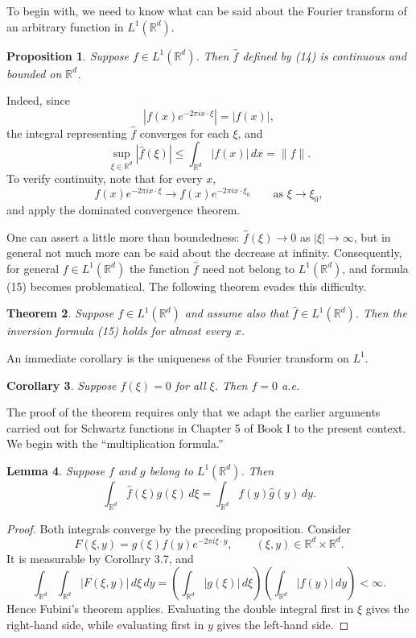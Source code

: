 \documentclass[11pt,openany]{book}
\newtheorem{theorem}{Theorem}[section]
\newtheorem{lemma}[theorem]{Lemma}
\newtheorem{corollary}[theorem]{Corollary}
\newtheorem{proposition}[theorem]{Proposition}
\begin{document}
To begin with, we need to know what can be said about the Fourier transform of an arbitrary function in $L^1(\mathbb{R}^d)$.

\begin{proposition}
Suppose $f\in L^1(\mathbb{R}^d)$. Then $\widehat f$ defined by (14) is continuous and bounded on $\mathbb{R}^d$.
\end{proposition}

Indeed, since
\[
|f(x)e^{-2\pi i x\cdot\xi}|=|f(x)|,
\]
the integral representing $\widehat f$ converges for each $\xi$, and
\[
\sup_{\xi\in\mathbb{R}^d}|\widehat f(\xi)|
\leq\int_{\mathbb{R}^d}|f(x)|\,dx
=\|f\|.
\]
To verify continuity, note that for every $x$,
\[
f(x)e^{-2\pi i x\cdot\xi}
\longrightarrow
f(x)e^{-2\pi i x\cdot\xi_0}
\qquad\text{as }\xi\to\xi_0,
\]
and apply the dominated convergence theorem.

One can assert a little more than boundedness: $\widehat f(\xi)\to0$ as $|\xi|\to\infty$, but in general not much more can be said about the decrease at infinity. Consequently, for general $f\in L^1(\mathbb{R}^d)$ the function $\widehat f$ need not belong to $L^1(\mathbb{R}^d)$, and formula (15) becomes problematical. The following theorem evades this difficulty.

\begin{theorem}
Suppose $f\in L^1(\mathbb{R}^d)$ and assume also that $\widehat f\in L^1(\mathbb{R}^d)$. Then the inversion formula (15) holds for almost every $x$.
\end{theorem}

An immediate corollary is the uniqueness of the Fourier transform on $L^1$.

\begin{corollary}
Suppose $\widehat f(\xi)=0$ for all $\xi$. Then $f=0$ a.e.
\end{corollary}

The proof of the theorem requires only that we adapt the earlier arguments carried out for Schwartz functions in Chapter 5 of Book I to the present context. We begin with the ``multiplication formula.''

\begin{lemma}
Suppose $f$ and $g$ belong to $L^1(\mathbb{R}^d)$. Then
\[
\int_{\mathbb{R}^d}\widehat f(\xi)g(\xi)\,d\xi
=\int_{\mathbb{R}^d}f(y)\widehat g(y)\,dy.
\]
\end{lemma}

\begin{proof}
Both integrals converge by the preceding proposition. Consider
\[
F(\xi,y)=g(\xi)f(y)e^{-2\pi i\xi\cdot y},
\qquad (\xi,y)\in\mathbb{R}^d\times\mathbb{R}^d.
\]
It is measurable by Corollary 3.7, and
\[
\int_{\mathbb{R}^d}\int_{\mathbb{R}^d}|F(\xi,y)|\,d\xi\,dy
=
\left(\int_{\mathbb{R}^d}|g(\xi)|\,d\xi\right)
\left(\int_{\mathbb{R}^d}|f(y)|\,dy\right)<\infty.
\]
Hence Fubini's theorem applies. Evaluating the double integral first in $\xi$ gives the right-hand side, while evaluating first in $y$ gives the left-hand side.
\end{proof}
\end{document}
